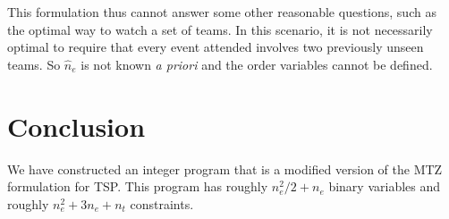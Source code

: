 \documentclass[11pt]{article}
\begin{document}
This formulation thus cannot answer some other reasonable questions, such as the optimal way to watch a set of teams. In this scenario, it is not necessarily optimal to require that every event attended involves two previously unseen teams. So $\hat{n}_e$ is not known \emph{a priori} and the order variables cannot be defined.

\section{Conclusion}
We have constructed an integer program that is a modified version of the MTZ formulation for TSP. This program has roughly $n_e^2 / 2 + n_e$ binary variables and roughly $n_e^2 + 3n_e + n_t$ constraints.
\end{document}
